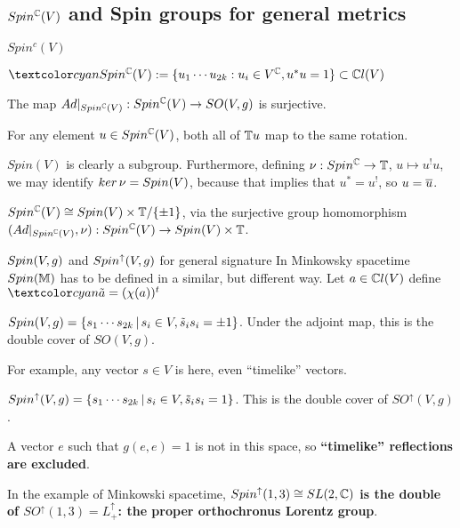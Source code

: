 \subsection{$Spin^\mathbb C(V)$ and Spin groups for general metrics}

\begin{frame}{$Spin^c(V)$} %

    \begin{Definition} $\defn{\spincv} := \set{u_1 \cdots u_{2k}: u_i \in V^\CC, u^*u = 1} \subset \cclv$
    \end{Definition}
    
    
    \begin{proposition}
    The map $Ad|_{Spin^\mathbb C(V)}: Spin^\mathbb C(V) \to SO(V, g)$ is surjective.
    
    For any element $u \in Spin^\mathbb C(V)$, both all of $\mathbb T u$ map to the same rotation.
    \end{proposition}
    
    $Spin(V)$ is clearly a subgroup. Furthermore,  defining $\nu: Spin^\mathbb C \to \mathbb T$, $u \mapsto u^! u$, we may identify $ker\,\nu = Spin(V)$, because that implies that $u^*= u^!$, so $u = \overline{u}$.
    
    $Spin^\mathbb C(V) \cong Spin(V) \times \mathbb T / \{\pm 1\}$, via the surjective group homomorphism $(Ad|_{Spin^\mathbb C(V)}, \nu): Spin^\mathbb C(V) \to Spin(V) \times \mathbb T$.
    
\end{frame}

\begin{frame}{$Spin(V, g)$ and $Spin^\uparrow(V, g)$ for general signature} %
    In Minkowsky spacetime $Spin(\mathbb M)$ has to be defined in a similar, but different way. Let $a \in \mathbb C l(V)$ define $\defn{\tilde a} = (\chi(a))^t$
    
    \begin{definition}
    $Spin(V, g) = \{s_1 \cdots s_{2k} \,|\, s_i \in V, \tilde s_i s_i = \pm 1\}$. Under the adjoint map, this is the double cover of $SO(V, g)$.
    \end{definition}
    
    For example, any vector $s \in V$ is here, even ``timelike'' vectors.
    
    \begin{definition}
    $Spin^\uparrow(V, g) = \{s_1 \cdots s_{2k} \,|\, s_i \in V, \tilde s_i s_i =  1\}$. This is the double cover of $SO^\uparrow(V, g)$.
    \end{definition}
    
    A vector $e$ such that $g(e, e)=1$ is not in this space, so \textbf{``timelike'' reflections are excluded}.
    
    In the example of Minkowski spacetime, \textbf{$Spin^\uparrow(1, 3) \cong SL(2, \mathbb C)$ is the double of $SO^\uparrow(1, 3) = L^\uparrow_+$: the proper orthochronus Lorentz group}.
    
\end{frame}

